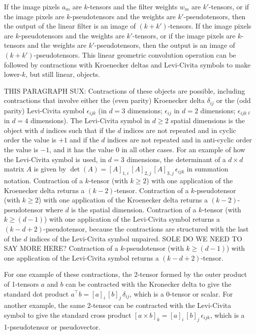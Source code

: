 \documentclass{article}
\theoremstyle{definition}
\begin{document}
If the image pixels $a_m$ are $k$-tensors and the filter weights $w_m$ are $k'$-tensors, or if the image pixels are $k$-pseudotensors and the weights are $k'$-pseudotensors, then the output of the linear filter is an image of $(k+k')$-tensors.
If the image pixels are $k$-pseudotensors and the weights are $k'$-tensors, or if the image pixels are $k$-tensors and the weights are $k'$-pseudotensors, then the output is an image of $(k+k')$-pseudotensors.
This linear geometric convolution operation can be followed by contractions with Kroenecker deltas and Levi-Civita symbols to make lower-$k$, but still linear, objects.

THIS PARAGRAPH SUX: Contractions of these objects are possible, including contractions that involve either the (even parity) Kroenecker delta $\delta_{ij}$ or the (odd parity) Levi-Civita symbol $\epsilon_{ijk}$ (in $d=3$ dimensions; $\epsilon_{ij}$ in $d=2$ dimensions; $\epsilon_{ijk\ell}$ in $d=4$ dimensions).
The Levi-Civita symbol in $d\geq 2$ spatial dimensions is the object with $d$ indices such that if the $d$ indices are not repeated and in cyclic order the value is $+1$ and if the $d$ indices are not repeated and in anti-cyclic order the value is $-1$, and it has the value $0$ in all other cases.
For an example of how the Levi-Civita symbol is used, in $d=3$ dimensions, the determinant of a $d\times d$ matrix $A$ is given by $\det(A) = [A]_{1,i}\,[A]_{2,j}\,[A]_{3,j}\,\epsilon_{ijk}$ in summation notation.
Contraction of a $k$-tensor (with $k\geq 2$) with one application of the Kroenecker delta returns a $(k-2)$-tensor.
Contraction of a $k$-pseudotensor (with $k\geq 2$) with one application of the Kroenecker delta returns a $(k-2)$-pseudotensor where $d$ is the spatial dimension.
Contraction of a $k$-tensor (with $k\geq (d-1)$) with one application of the Levi-Civita symbol returns a $(k-d+2)$-pseudotensor, because the contractions are structured with the last of the $d$ indices of the Levi-Civita symbol unpaired. SOLE DO WE NEED TO SAY MORE HERE?
Contraction of a $k$-pseudotensor (with $k\geq (d-1)$) with one application of the Levi-Civita symbol returns a $(k-d+2)$-tensor.

For one example of these contractions, the 2-tensor formed by the outer product of 1-tensors $a$ and $b$ can be contracted with the Kronecker delta to give the standard dot product $a^\top b = [a]_i\,[b]_j\,\delta_{ij}$, which is a 0-tensor or scalar.
For another example, the same 2-tensor can be contracted with the Levi-Civita symbol to give the standard cross product
$[a\times b]_k = [a]_i\,[b]_j\,\epsilon_{ijk}$, which is a 1-pseudotensor or pseudovector.
\end{document}

